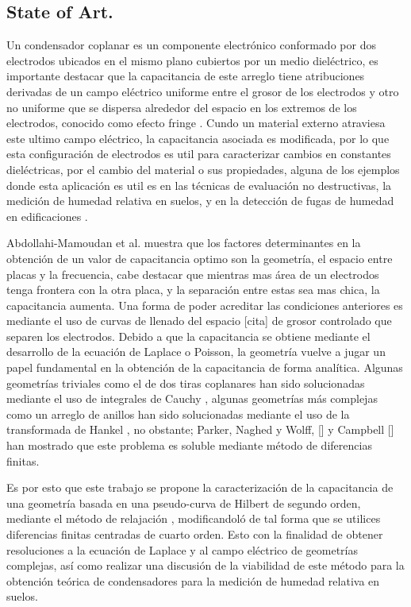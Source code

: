 \subsection{State of Art.}


Un condensador coplanar es un componente electrónico conformado por dos electrodos ubicados en el mismo plano cubiertos por un medio dieléctrico, es importante destacar que la capacitancia de este arreglo tiene atribuciones derivadas de
un campo eléctrico uniforme entre el grosor de los electrodos y otro no uniforme que se dispersa alrededor del espacio en los extremos de los electrodos, conocido como efecto fringe \ut{[bao]} \ut{[eren]}. Cundo un material externo atraviesa este 
ultimo campo eléctrico, la capacitancia asociada es modificada, por lo que esta configuración de electrodos es util para caracterizar cambios en constantes dieléctricas, por el cambio del material o sus propiedades, alguna de los ejemplos 
donde esta aplicación es util es en las técnicas de evaluación no destructivas, la medición de humedad relativa en suelos, y en la detección de fugas de humedad en edificaciones \ut{[mwelango], [cita], [cita]}.  

Abdollahi-Mamoudan et al.\ut{[cita]} muestra que los factores determinantes en la obtención de un valor de capacitancia optimo son la geometría, el espacio entre placas y la frecuencia, cabe destacar que mientras mas área de un electrodos tenga 
frontera con la otra placa, y la separación entre estas sea mas chica, la capacitancia aumenta. Una forma de poder acreditar las condiciones anteriores es mediante el uso de curvas de llenado del espacio [cita] de grosor controlado 
que separen los electrodos. Debido a que la capacitancia se obtiene mediante el desarrollo de la ecuación de Laplace o Poisson, la geometría vuelve a jugar un papel fundamental en la obtención de la capacitancia de forma analítica. Algunas 
geometrías triviales como el de dos tiras coplanares han sido solucionadas mediante el uso de integrales de Cauchy \ut{[zypman]}, algunas geometrías más complejas como un arreglo de anillos han sido solucionadas mediante el uso de la transformada
de Hankel \ut{[guo]}, no obstante; Parker, Naghed y Wolff, [] y Campbell [] han mostrado que este problema es soluble mediante método de diferencias finitas.

Es por esto que este trabajo se propone la caracterización de la capacitancia de una geometría basada en una pseudo-curva de Hilbert de segundo orden, mediante el método de relajación \ut{[cita]}, modificandoló de tal forma que se utilices diferencias 
finitas centradas de cuarto orden. Esto con la finalidad de obtener resoluciones a la ecuación de Laplace y al campo eléctrico de geometrías complejas, así como realizar una discusión de la viabilidad de este método para la obtención teórica de
condensadores para la medición de humedad relativa en suelos. 



